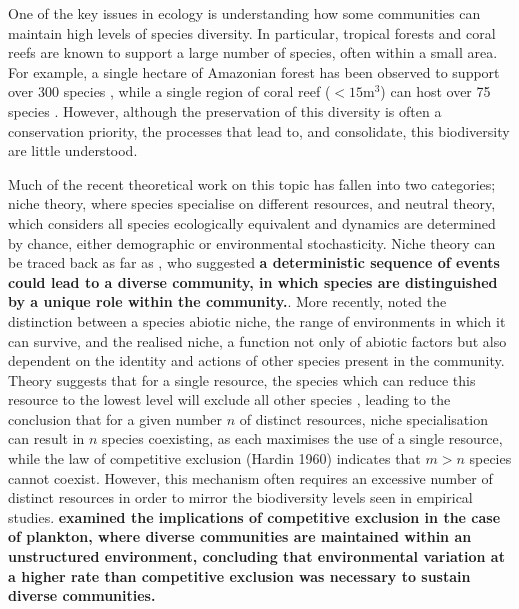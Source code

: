 One of the key issues in ecology is understanding how some communities can maintain high levels of species diversity. In particular, tropical forests and coral reefs are known to support a large number of species, often within a small area. For example, a single hectare of Amazonian forest has been observed to support over 300 species \citep{valencia1994high}, while a single region of coral reef ($<15$m$^3$) can host over 75 species \citep{smith1972space}. However, although the preservation of this diversity is often a conservation priority, the processes that lead to, and consolidate, this biodiversity are little understood.

Much of the recent theoretical work on this topic has fallen into two categories; niche theory, where species specialise on different resources, and neutral theory, which considers all species ecologically equivalent and dynamics are determined by chance, either demographic or environmental stochasticity. Niche theory can be traced back as far as \cite{darwinorigin}, who suggested \textbf{a deterministic sequence of events could lead to a diverse community, in which species are distinguished by a unique role within the community.}. More recently, \cite{hutchinson1957concluding} noted the distinction between a species abiotic niche, the range of environments in which it can survive, and the realised niche, a function not only of abiotic factors but also dependent on the identity and actions of other species present in the community. Theory suggests that for a single resource, the species which can reduce this resource to the lowest level will exclude all other species \citep[e.g.][]{tilman1980resources,tilman1991dynamics}, leading to the conclusion that for a given number $n$ of distinct resources, niche specialisation can result in $n$ species coexisting, as each maximises the use of a single resource, while the law of competitive exclusion (Hardin 1960) indicates that $m>n$ species cannot coexist. However, this mechanism often requires an excessive number of distinct resources in order to mirror the biodiversity levels seen in empirical studies. \textbf{\cite{hutchinson1961paradox} examined the implications of competitive exclusion  in the case of plankton, where diverse communities are maintained within an unstructured environment, concluding that environmental variation at a higher rate than competitive exclusion was necessary to sustain diverse communities.}

